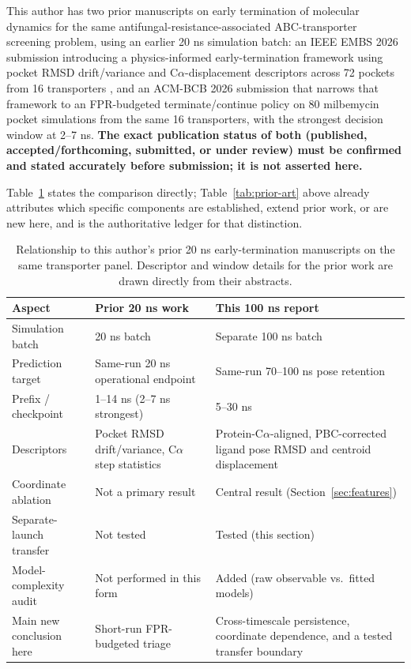 \documentclass[11pt]{article}
\begin{document}
This author has two prior manuscripts on early termination of molecular dynamics for the same antifungal-resistance-associated ABC-transporter screening problem, using an earlier 20 ns simulation batch: an IEEE EMBS 2026 submission introducing a physics-informed early-termination framework using pocket RMSD drift/variance and C$\alpha$-displacement descriptors across 72 pockets from 16 transporters \cite{jing2026embs}, and an ACM-BCB 2026 submission that narrows that framework to an FPR-budgeted terminate/continue policy on 80 milbemycin pocket simulations from the same 16 transporters, with the strongest decision window at 2--7 ns. \textbf{The exact publication status of both (published, accepted/forthcoming, submitted, or under review) must be confirmed and stated accurately before submission; it is not asserted here.}

Table~\ref{tab:companion} states the comparison directly; Table~\ref{tab:prior-art} above already attributes which specific components are established, extend prior work, or are new here, and is the authoritative ledger for that distinction.

\begin{table}[htbp]
\centering
\caption{Relationship to this author's prior 20 ns early-termination manuscripts on the same transporter panel. Descriptor and window details for the prior work are drawn directly from their abstracts.}
\label{tab:companion}
\small
\setlength{\tabcolsep}{4pt}
\begin{tabular}{p{} p{} p{}}
\toprule
\textbf{Aspect} & \textbf{Prior 20 ns work \cite{jing2026embs}} & \textbf{This 100 ns report} \\
\midrule
Simulation batch & 20 ns batch & Separate 100 ns batch \\
Prediction target & Same-run 20 ns operational endpoint & Same-run 70--100 ns pose retention \\
Prefix / checkpoint & 1--14 ns (2--7 ns strongest) & 5--30 ns \\
Descriptors & Pocket RMSD drift/variance, C$\alpha$ step statistics & Protein-C$\alpha$-aligned, PBC-corrected ligand pose RMSD and centroid displacement \\
Coordinate ablation & Not a primary result & Central result (Section~\ref{sec:features}) \\
Separate-launch transfer & Not tested & Tested (this section) \\
Model-complexity audit & Not performed in this form & Added (raw observable vs.\ fitted models) \\
Main new conclusion here & Short-run FPR-budgeted triage & Cross-timescale persistence, coordinate dependence, and a tested transfer boundary \\
\bottomrule
\end{tabular}
\end{table}
\end{document}
